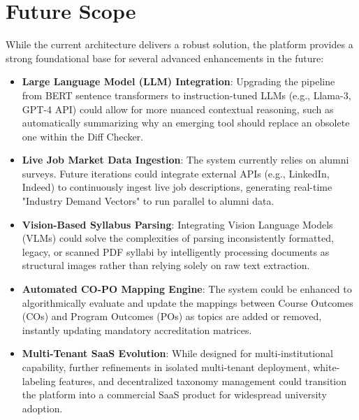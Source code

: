 \section{Future Scope}
While the current architecture delivers a robust solution, the platform provides a strong foundational base for several advanced enhancements in the future:
\begin{itemize}
    \item \textbf{Large Language Model (LLM) Integration}: Upgrading the pipeline from BERT sentence transformers to instruction-tuned LLMs (e.g., Llama-3, GPT-4 API) could allow for more nuanced contextual reasoning, such as automatically summarizing why an emerging tool should replace an obsolete one within the Diff Checker.
    \item \textbf{Live Job Market Data Ingestion}: The system currently relies on alumni surveys. Future iterations could integrate external APIs (e.g., LinkedIn, Indeed) to continuously ingest live job descriptions, generating real-time "Industry Demand Vectors" to run parallel to alumni data.
    \item \textbf{Vision-Based Syllabus Parsing}: Integrating Vision Language Models (VLMs) could solve the complexities of parsing inconsistently formatted, legacy, or scanned PDF syllabi by intelligently processing documents as structural images rather than relying solely on raw text extraction.
    \item \textbf{Automated CO-PO Mapping Engine}: The system could be enhanced to algorithmically evaluate and update the mappings between Course Outcomes (COs) and Program Outcomes (POs) as topics are added or removed, instantly updating mandatory accreditation matrices.
    \item \textbf{Multi-Tenant SaaS Evolution}: While designed for multi-institutional capability, further refinements in isolated multi-tenant deployment, white-labeling features, and decentralized taxonomy management could transition the platform into a commercial SaaS product for widespread university adoption.
\end{itemize}
